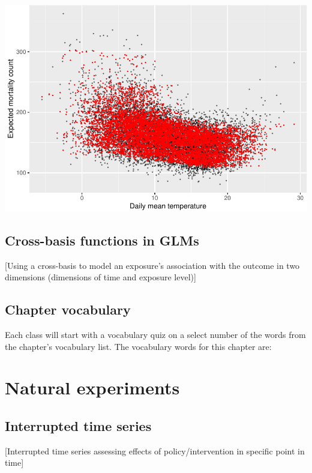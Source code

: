 \documentclass[
]{book}
\begin{document}
\includegraphics{adv_epi_analysis_files/figure-latex/unnamed-chunk-57-1.pdf}

\hypertarget{cross-basis-functions-in-glms}{%
\section{Cross-basis functions in GLMs}\label{cross-basis-functions-in-glms}}

{[}Using a cross-basis to model an exposure's association with the
outcome in two dimensions (dimensions of time and exposure level){]}

\hypertarget{chapter-vocabulary-1}{%
\section{Chapter vocabulary}\label{chapter-vocabulary-1}}

Each class will start with a vocabulary quiz on a select number of the words
from the chapter's vocabulary list. The vocabulary words for this chapter are:

\hypertarget{natural-experiments}{%
\chapter{Natural experiments}\label{natural-experiments}}

\hypertarget{interrupted-time-series}{%
\section{Interrupted time series}\label{interrupted-time-series}}

{[}Interrupted time series assessing effects of policy/intervention in specific point in time{]}
\end{document}
